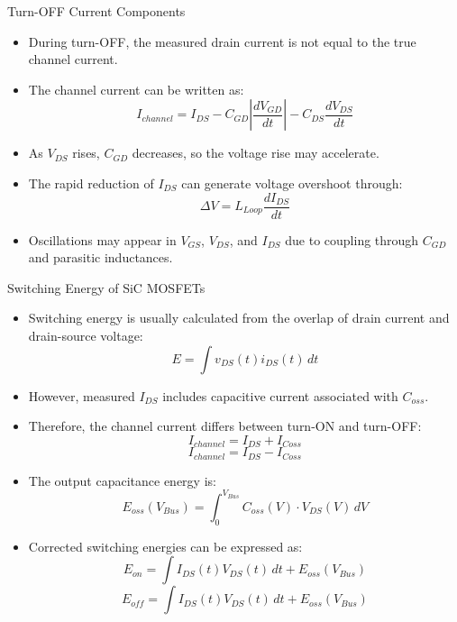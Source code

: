 \begin{frame}{Turn-OFF Current Components}
\begin{itemize}
    \item During turn-OFF, the measured drain current is not equal to the true channel current.
    \item The channel current can be written as:
    \[
    I_{channel}
    =
    I_{DS}
    -
    C_{GD}\left|\frac{dV_{GD}}{dt}\right|
    -
    C_{DS}\frac{dV_{DS}}{dt}
    \]
    \item As $V_{DS}$ rises, $C_{GD}$ decreases, so the voltage rise may accelerate.
    \item The rapid reduction of $I_{DS}$ can generate voltage overshoot through:
    \[
    \Delta V=L_{Loop}\frac{dI_{DS}}{dt}
    \]
    \item Oscillations may appear in $V_{GS}$, $V_{DS}$, and $I_{DS}$ due to coupling through $C_{GD}$ and parasitic inductances.
\end{itemize}
\end{frame}



\begin{frame}{Switching Energy of SiC MOSFETs}
\begin{itemize}
    \item Switching energy is usually calculated from the overlap of drain current and drain-source voltage:
    \[
    E=\int v_{DS}(t)i_{DS}(t)\,dt
    \]
    \item However, measured $I_{DS}$ includes capacitive current associated with $C_{oss}$.
    \item Therefore, the channel current differs between turn-ON and turn-OFF:
    \[
    I_{channel}=I_{DS}+I_{Coss}
    \]
    \[
    I_{channel}=I_{DS}-I_{Coss}
    \]
    \item The output capacitance energy is:
    \[
    E_{oss}(V_{Bus})=
    \int_{0}^{V_{Bus}} C_{oss}(V)\cdot V_{DS}(V)\,dV
    \]
    \item Corrected switching energies can be expressed as:
    \[
    E_{on}=\int I_{DS}(t)V_{DS}(t)\,dt+E_{oss}(V_{Bus})
    \]
    \[
    E_{off}=\int I_{DS}(t)V_{DS}(t)\,dt+E_{oss}(V_{Bus})
    \]
\end{itemize}
\end{frame}



